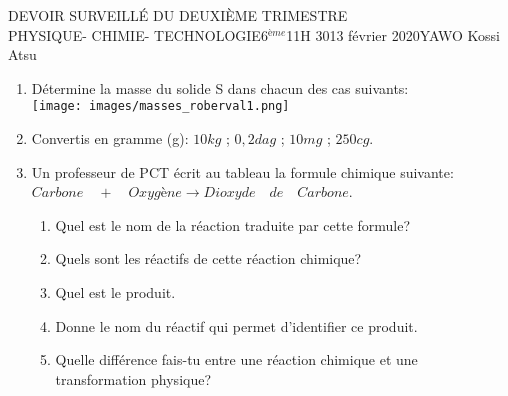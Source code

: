 \documentclass[12pt,a4paper]{book}
\newcommand{\prof}{YAWO Kossi Atsu}
\newcommand{\matiere}{\\PHYSIQUE- CHIMIE- TECHNOLOGIE}
\newcommand{\classe}{6$^{ème}$}
\begin{document}
\begin{devoir}{DEVOIR SURVEILLÉ DU DEUXIÈME TRIMESTRE}{\matiere}{\classe}{1}{1H 30}{13 février 2020}{\prof}
\begin{exo}[4,5]
\begin{multicols}{2}
\vspace{1cm}
\end{multicols}
\end{exo}

\vspace{0.5cm}
\begin{exo}[7,5]
\begin{enumerate}
\item Détermine la masse du solide S dans chacun des cas suivants:\\
\texttt{[image: images/masses\_roberval1.png]}
\item Convertis en gramme (g):
$10kg$ \qquad ; \qquad $0,2dag$ \qquad ; \qquad $10mg$ \qquad ; \qquad $250cg$.
\item Un professeur de PCT écrit au tableau la formule chimique suivante:\\ 
$Carbone \quad + \quad Oxygène \rightarrow Dioxyde \quad de \quad Carbone$.
\begin{enumerate}
\item Quel est le nom de la réaction traduite par cette formule?
\item Quels sont les réactifs de cette réaction chimique?
\item Quel est le produit.
\item Donne le nom du réactif qui permet d'identifier ce produit.
\item Quelle différence fais-tu entre une réaction chimique et une transformation physique?
\end{enumerate}
\end{enumerate}
\end{exo}

\end{devoir}
\end{document}
